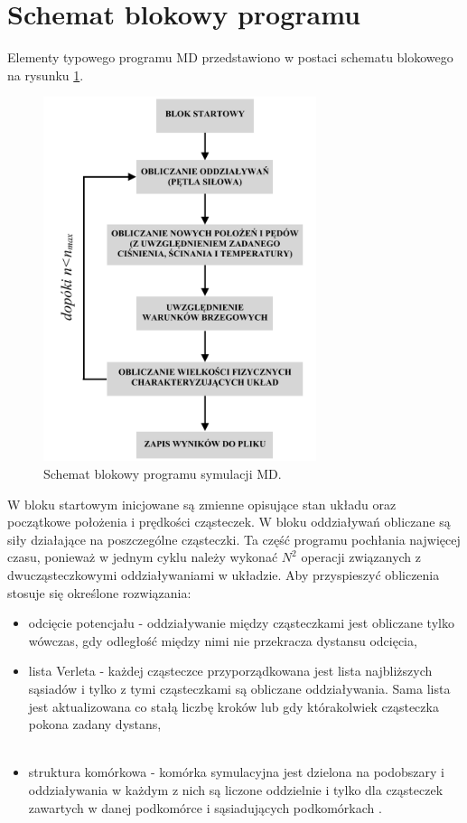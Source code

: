 \documentclass[12pt,a4paper,openright]{report} %
\begin{document}
\section{Schemat blokowy programu}
%
Elementy typowego programu MD przedstawiono w postaci schematu blokowego na rysunku \ref{schemat_blokowy}. 
\begin{figure}[h]
\centering
\includegraphics[width=80mm]{rysunki/schemat_blokowy.pdf}
\caption{Schemat blokowy programu symulacji MD.}
\label{schemat_blokowy}
\end{figure}
W bloku startowym inicjowane są zmienne opisujące stan układu oraz początkowe położenia i prędkości cząsteczek. W bloku oddziaływań obliczane są siły działające na poszczególne cząsteczki. Ta część programu pochłania najwięcej czasu, ponieważ w jednym cyklu należy wykonać $N^2$ operacji związanych z dwucząsteczkowymi oddziaływaniami w układzie. Aby przyspieszyć obliczenia stosuje się określone rozwiązania:
\begin{itemize}
\item{odcięcie potencjału - oddziaływanie między cząsteczkami jest obliczane tylko wówczas, gdy odległość między nimi nie przekracza dystansu odcięcia,}
\item{lista Verleta - każdej cząsteczce przyporządkowana jest lista najbliższych sąsiadów i tylko z tymi cząsteczkami są obliczane oddziaływania. Sama lista jest aktualizowana co stałą liczbę kroków lub gdy którakolwiek cząsteczka pokona zadany dystans, }\\
\\
\item{struktura komórkowa - komórka symulacyjna jest dzielona na podobszary i oddziaływania w każdym z nich są liczone oddzielnie i tylko dla cząsteczek zawartych w danej podkomórce i sąsiadujących podkomórkach \cite{AllenTildesley}. }
\end{itemize}
\end{document}
